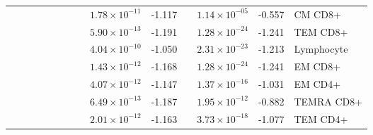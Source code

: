 \documentclass{book}
\begin{document}
\begin{refsection}
\begin{landscape}
\begin{table}
\begin{tabular}{m{0.4cm}m{1cm}m{1.5cm}p{0.5cm}p{1cm}p{1.3cm}p{0.4cm}p{0cm}p{1.3cm}p{0.7cm}p{0cm}p{1.3cm}p{0.7cm}p{1.6cm}}
    \cline{9-14}
                          &                              &                                &                          &                                     &                                                        &                     && $1.78 \times 10^{-11}$ & -1.117 && $1.14 \times 10^{-05}$ & -0.557      & CM CD8+     \\
    \cline{9-14}
                          &                              &                                &                          &                                     &                                                        &                     && $5.90 \times 10^{-13}$ & -1.191 && $1.28 \times 10^{-24}$ & -1.241      & TEM CD8+    \\
    \cline{9-14}
                          &                              &                                &                          &                                     &                                                        &                     && $4.04 \times 10^{-10}$ & -1.050 && $2.31 \times 10^{-23}$ & -1.213      & Lymphocyte       \\
    \cline{9-14}
                          &                              &                                &                          &                                     &                                                        &                     && $1.43 \times 10^{-12}$ & -1.168 && $1.28 \times 10^{-24}$ & -1.241      & EM CD8+     \\
    \cline{9-14}
                          &                              &                                &                          &                                     &                                                        &                     && $4.07 \times 10^{-12}$ & -1.147 && $1.37 \times 10^{-16}$ & -1.031      & EM CD4+     \\
    \cline{9-14}
                          &                              &                                &                          &                                     &                                                        &                     && $6.49 \times 10^{-13}$ & -1.187 && $1.95 \times 10^{-12}$ & -0.882      & TEMRA CD8+  \\
    \cline{9-14}
                          &                              &                                &                          &                                     &                                                        &                     && $2.01 \times 10^{-12}$ & -1.163 && $3.73 \times 10^{-18}$ & -1.077      & TEM CD4+    \\

\end{tabular}
\end{table}
\end{landscape}
\end{refsection}
\end{document}
